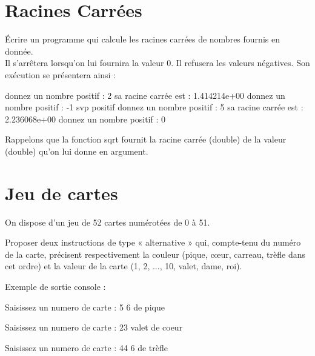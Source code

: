 \documentclass[10pt]{article}
\begin{document}
\maketitle
\thispagestyle{firstpage}

\section{Racines Carrées}
Écrire un programme qui calcule les racines carrées de nombres fournis en donnée.\\
Il s’arrêtera lorsqu’on lui fournira la valeur 0. Il refusera les valeurs négatives. Son
exécution se présentera ainsi :

\begin{textcode}
    donnez un nombre positif : 2
    sa racine carrée est : 1.414214e+00 donnez un nombre positif : -1
    svp positif
    donnez un nombre positif : 5
    sa racine carrée est : 2.236068e+00 donnez un nombre positif : 0
\end{textcode}

\begin{noteblock}
    Rappelons que la fonction sqrt fournit la racine carrée (double) de la valeur (double) qu’on lui donne en argument.
\end{noteblock}


\section{Jeu de cartes}
On dispose d'un jeu de 52 cartes numérotées de 0 à 51.

\smallskip
Proposer deux instructions de type « alternative » qui, compte-tenu du numéro de la carte, précisent respectivement la couleur (pique, cœur, carreau, trèfle dans cet ordre) et la valeur de la carte (1, 2, ..., 10, valet, dame, roi).

Exemple de sortie console :

\begin{textcode}
    Saisissez un numero de carte : 5
    6 de pique

    Saisissez un numero de carte : 23
    valet de coeur

    Saisissez un numero de carte : 44
    6 de trèfle
\end{textcode}
\end{document}

